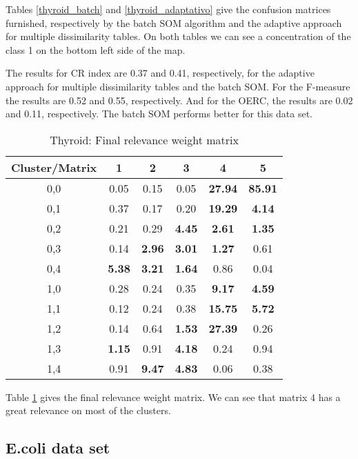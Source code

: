 \documentclass[10pt, conference, compsocconf]{IEEEtran}
\begin{document}
Tables \ref{thyroid_batch} and \ref{thyroid_adaptativo} give the confusion matrices furnished, respectively by the batch SOM algorithm and the adaptive approach for multiple dissimilarity tables. On both tables we can see a concentration of the class 1 on the bottom left side of the map.

The results for CR index are 0.37 and 0.41, respectively, for the adaptive approach for multiple dissimilarity tables and the batch SOM. For the F-measure the results are 0.52 and 0.55, respectively. And for the OERC, the results are 0.02 and 0.11, respectively. The batch SOM performs better for this data set.

\begin{table}[!h]
\renewcommand{\arraystretch}{1.2}
\begin{center}
\caption{Thyroid: Final relevance weight matrix}
\begin{tabular}{|c|c|c|c|c|c|}
\hline
Cluster/Matrix & 1 & 2 & 3 & 4 & 5 \\ \hline
0,0 & 0.05 & 0.15 & 0.05 & \textbf{27.94} & \textbf{85.91} \\ \hline
0,1 & 0.37 & 0.17 & 0.20 & \textbf{19.29} & \textbf{4.14} \\ \hline
0,2 & 0.21 & 0.29 & \textbf{4.45} & \textbf{2.61} & \textbf{1.35} \\ \hline
0,3 & 0.14 & \textbf{2.96} & \textbf{3.01} & \textbf{1.27} & 0.61 \\ \hline
0,4 & \textbf{5.38} & \textbf{3.21} & \textbf{1.64} & 0.86 & 0.04 \\ \hline
1,0 & 0.28 & 0.24 & 0.35 & \textbf{9.17} & \textbf{4.59} \\ \hline
1,1 & 0.12 & 0.24 & 0.38 & \textbf{15.75} & \textbf{5.72} \\ \hline
1,2 & 0.14 & 0.64 & \textbf{1.53} & \textbf{27.39} & 0.26 \\ \hline
1,3 & \textbf{1.15} & 0.91 & \textbf{4.18} & 0.24 & 0.94 \\ \hline
1,4 & 0.91 & \textbf{9.47} & \textbf{4.83} & 0.06 & 0.38 \\ \hline

\end{tabular}
\label{thyroid_pesos}
\end{center}
\end{table}

Table \ref{thyroid_pesos} gives the final relevance weight matrix. We can see that matrix 4 has a great relevance on most of the clusters.

\subsection{E.coli data set}
\end{document}
